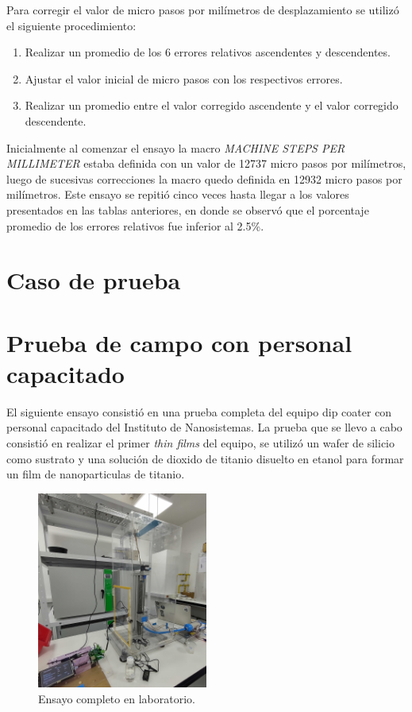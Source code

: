 Para corregir el valor de micro pasos por milímetros de desplazamiento se utilizó el siguiente procedimiento:
\begin{enumerate}
\item Realizar un promedio de los 6 errores relativos ascendentes y descendentes.
\item Ajustar el valor inicial de micro pasos con los respectivos errores. 
\item Realizar un promedio entre el valor corregido ascendente y el valor corregido descendente.
\end{enumerate}


Inicialmente al comenzar el ensayo la macro \textit{MACHINE STEPS PER MILLIMETER}  estaba definida con un valor de 12737 micro pasos por milímetros, luego de sucesivas correcciones la macro quedo definida en 12932 micro pasos por milímetros.
Este ensayo se repitió cinco veces hasta llegar a los valores presentados en las tablas anteriores, en donde se observó que el porcentaje promedio de los errores relativos fue inferior al 2.5\%.

\section{Caso de prueba}
\section{Prueba de campo con personal capacitado}

El siguiente ensayo consistió en una prueba completa del equipo dip coater con personal capacitado del Instituto de Nanosistemas.
La prueba que se llevo a cabo consistió en realizar el primer \textit{thin films} del equipo, se utilizó un wafer de silicio como sustrato y una solución de dioxido de titanio disuelto en etanol para formar un film de nanoparticulas de titanio.

\begin{figure}[h]
\centering 
\includegraphics[width=0.5\textwidth]{./Figures/prueba_b.jpg}
\caption{Ensayo completo en laboratorio.}
\label{fig:desplazamiento_lineal}
\end{figure}


